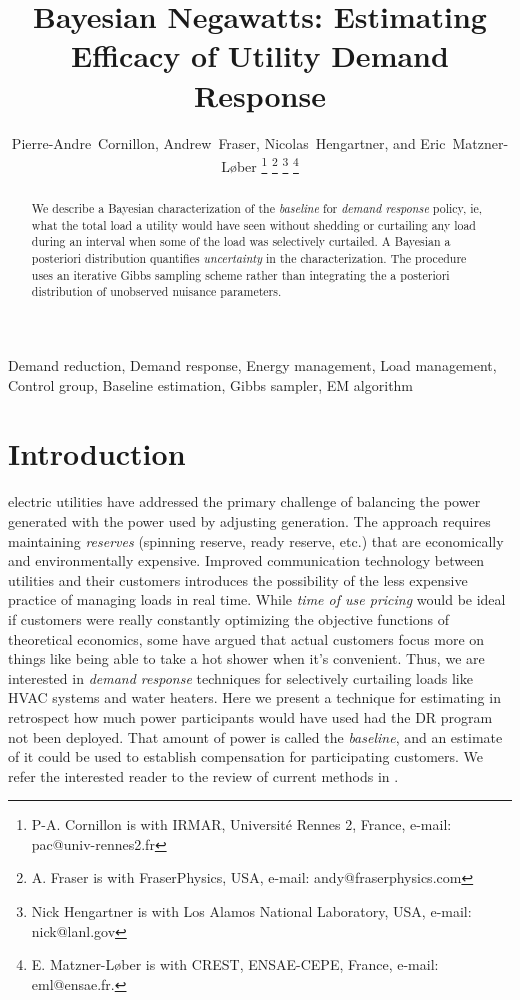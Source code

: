 \documentclass[journal]{IEEEtran}
\begin{document}
\title{Bayesian Negawatts: Estimating Efficacy of Utility Demand Response}

\author{
  Pierre-Andre~Cornillon,
  Andrew~Fraser,
  Nicolas~Hengartner,
  and Eric~Matzner-L{\o}ber
\thanks{P-A. Cornillon is with IRMAR, Universit\'e Rennes 2, France, e-mail: pac@univ-rennes2.fr}%
\thanks{A. Fraser is with FraserPhysics, USA, e-mail: andy@fraserphysics.com}%
\thanks{Nick Hengartner is with Los Alamos National Laboratory, USA,
  e-mail: nick@lanl.gov}%
\thanks{E. Matzner-L{\o}ber is with CREST, ENSAE-CEPE, France,
  e-mail: eml@ensae.fr.}
}
\maketitle

\begin{abstract}
  We describe a Bayesian characterization of the \emph{baseline} for
  \emph{demand response} policy, ie, what the total load a utility
  would have seen without shedding or curtailing any load during an
  interval when some of the load was selectively curtailed.  A
  Bayesian a posteriori distribution quantifies \emph{uncertainty} in
  the characterization.  The procedure uses an iterative Gibbs
  sampling scheme rather than integrating the a posteriori
  distribution of unobserved nuisance parameters.
\end{abstract}

\begin{IEEEkeywords}
Demand reduction, Demand response, Energy management, Load management,
Control group, Baseline estimation, Gibbs sampler, EM algorithm
\end{IEEEkeywords}

\IEEEpeerreviewmaketitle

\section{Introduction}
\label{sec:intro}

 electric utilities have addressed the
primary challenge of balancing the power generated with the power used
by adjusting generation.  The approach requires maintaining
\emph{reserves} (spinning reserve, ready reserve, etc.) that are
economically and environmentally expensive.  Improved communication
technology between utilities and their customers introduces the
possibility of the less expensive practice of managing loads in real
time.  While \emph{time of use pricing} would be ideal if customers
were really constantly optimizing the objective functions of
theoretical economics, some have argued\cite{meyn} that actual
customers focus more on things like being able to take a hot shower
when it's convenient.  Thus, we are interested in \emph{demand
  response} techniques for selectively curtailing loads like HVAC
systems and water heaters.  Here we present a technique for estimating
in retrospect how much power participants would have used had the DR
program not been deployed.  That amount of power is called the
\emph{baseline}, and an estimate of it could be used to establish
compensation for participating customers.  We refer the interested
reader to the review of current methods in \cite{directestimation}.
\end{document}
